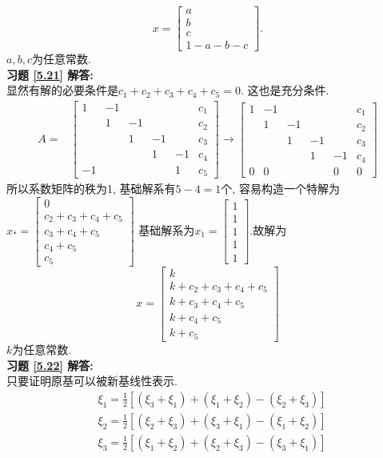 $$x=\begin{bmatrix}a\\b\\c\\1-a-b-c\end{bmatrix}.$$
$a,b,c$为任意常数.\\
\textbf{习题 \ref{5.21} 解答:}\\
显然有解的必要条件是$c_1+c_2+c_3+c_4+c_5=0$. 这也是充分条件.
\begin{displaymath}
\begin{aligned}
A=&\begin{bmatrix}  1&-1& & & &c_1\\ &1&-1& & &c_2\\ & &1&-1& &c_3\\ & & &1&-1&c_4\\-1& & & &1&c_5\end{bmatrix}\rightarrow
\begin{bmatrix} 1&-1& & & &c_1\\ &1&-1& & &c_2\\ & &1&-1& &c_3\\ & & &1&-1&c_4\\0&0 & & &0&0    \end{bmatrix} \end{aligned} \end{displaymath}
所以系数矩阵的秩为1, 基础解系有$5-4=1$个, 容易构造一个特解为
$x_{*}=\begin{bmatrix}0\\c_2+c_3+c_4+c_5\\c_3+c_4+c_5\\c_4+c_5\\c_5\end{bmatrix}$
基础解系为$x_1=\begin{bmatrix}1\\1\\1\\1\\1\end{bmatrix}$.故解为
$$x=\begin{bmatrix} k\\k+c_2+c_3+c_4+c_5\\k+c_3+c_4+c_5\\k+c_4+c_5\\k+c_5\end{bmatrix}$$
$k$为任意常数.\\
\textbf{习题 \ref{5.22} 解答:}\\
只要证明原基可以被新基线性表示.
\begin{displaymath}
\begin{aligned}
&\xi_1=\frac{1}{2} [(\xi_3+\xi_1 )+(\xi _1+\xi_2 )-(\xi_2+\xi_3 )]\\
&\xi_2=\frac{1}{2}[(\xi_2+\xi_3 )+(\xi_3+\xi_1 )-(\xi_1+\xi_2 )]\\
&\xi_3=\frac{1}{2} [(\xi_1+\xi_2 )+(\xi_2+\xi_3 )-(\xi_3+\xi_1 )]\end{aligned}\end{displaymath}
